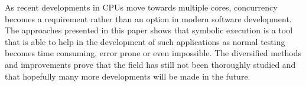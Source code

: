 \documentclass[10pt]{llncs}
\begin{document}
As recent developments in CPUs move towards multiple cores, concurrency becomes a requirement rather than an option in modern software development. The approaches presented in this paper shows that symbolic execution is a tool that is able to help in the development of such applications as normal testing becomes time consuming, error prone or even impossible. The diversified methods and improvements prove that the field has still not been thoroughly studied and that hopefully many more developments will be made in the future.



\end{document}
